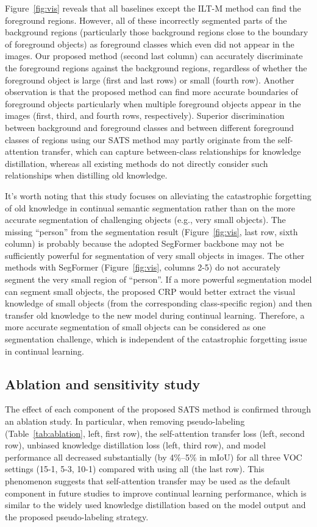 \documentclass[onecolumn,conference,compsoc]{IEEEtran}
\begin{document}
\begin{spacing}{1.5}
Figure~\ref{fig:vis}  {reveals that} all baselines except the ILT-M method can find the foreground regions. However, all of  {these} incorrectly segmented parts of the background regions (particularly those background regions close to the boundary of foreground objects) as foreground classes which {even did not} appear in the images. Our proposed method (second last column) can accurately discriminate the foreground regions against the background regions,  {regardless of} whether the foreground object is large (first and last rows) or small (fourth row). Another observation is that the proposed method can find more accurate boundaries of foreground objects particularly when multiple foreground objects appear in the images (first, third, and fourth  {rows, respectively). Superior} discrimination between background and foreground classes and between different foreground classes of regions  {using} our SATS method may partly  {originate} from the self-attention transfer, which can capture between-class relationships for knowledge distillation,  {whereas} all existing methods do not directly consider such relationships when distilling old knowledge.

It's worth noting that this study focuses on alleviating the catastrophic forgetting of old knowledge in continual semantic segmentation rather than on the more accurate segmentation of challenging objects (e.g., very small objects). The missing “person” from the segmentation result (Figure~\ref{fig:vis}, last row, sixth column) is probably because the adopted SegFormer backbone may not be  {sufficiently} powerful for segmentation of very small objects in images. The other methods with SegFormer (Figure~\ref{fig:vis}, columns 2-5) {do} not  {accurately} segment the very small region of “person”. If a more powerful segmentation model can segment small objects, the proposed CRP would better extract the visual knowledge of small objects (from the corresponding class-specific region) and then transfer old knowledge to the new model during continual learning. Therefore,  {a more accurate segmentation of} small objects can be considered as one segmentation challenge, which is independent of the catastrophic forgetting issue in continual learning.


\subsection{Ablation and sensitivity study}

The effect of each component of the proposed SATS method is confirmed  {through an} ablation study. In particular, when removing pseudo-labeling (Table~\ref{tab:ablation}, left, first row), the self-attention transfer loss  (left, second row), unbiased knowledge distillation loss  (left, third row), and model performance all decreased substantially (by 4\%–5\% in mIoU) for all three VOC settings (15-1, 5-3, 10-1) compared  {with} using all (the last row). This  {phenomenon} suggests that self-attention transfer may be used as the default component in future studies  {to improve} continual learning performance,  {which is similar to} the widely used knowledge distillation based on the model output and the proposed pseudo-labeling strategy.


\end{spacing}
\end{document}
